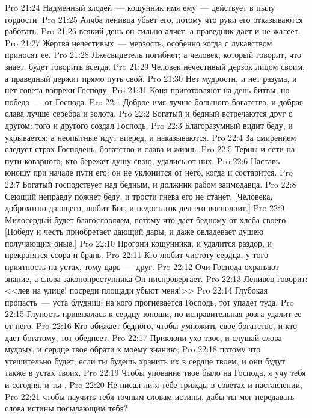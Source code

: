\vs Pro 21:24 Надменный злодей~--- кощунник имя ему~--- действует в пылу гордости.
\vs Pro 21:25 Алчба ленивца убьет его, потому что руки его отказываются работать;
\vs Pro 21:26 всякий день он сильно алчет, а праведник дает и не жалеет.
\vs Pro 21:27 Жертва нечестивых~--- мерзость, особенно когда с лукавством приносят ее.
\vs Pro 21:28 Лжесвидетель погибнет; а человек, который говорит, что знает, будет говорить всегда.
\vs Pro 21:29 Человек нечестивый дерзок лицом своим, а праведный держит прямо путь свой.
\vs Pro 21:30 Нет мудрости, и нет разума, и нет совета вопреки Господу.
\vs Pro 21:31 Коня приготовляют на день битвы, но победа~--- от Господа.
\vs Pro 22:1 Доброе имя лучше большого богатства, и добрая слава лучше серебра и золота.
\vs Pro 22:2 Богатый и бедный встречаются друг с другом: того и другого создал Господь.
\vs Pro 22:3 Благоразумный видит беду, и укрывается; а неопытные идут вперед, и наказываются.
\vs Pro 22:4 За смирением следует страх Господень, богатство и слава и жизнь.
\vs Pro 22:5 Терны и сети на пути коварного; кто бережет душу свою, удались от них.
\vs Pro 22:6 Наставь юношу при начале пути его: он не уклонится от него, когда и состарится.
\vs Pro 22:7 Богатый господствует над бедным, и должник  рабом заимодавца.
\vs Pro 22:8 Сеющий неправду пожнет беду, и трости гнева его не станет. [Человека, доброхотно дающего, любит Бог, и недостаток дел его восполнит.]
\vs Pro 22:9 Милосердый будет благословляем, потому что дает бедному от хлеба своего. [Победу и честь приобретает дающий дары, и даже овладевает душею получающих оные.]
\vs Pro 22:10 Прогони кощунника, и удалится раздор, и прекратятся ссора и брань.
\vs Pro 22:11 Кто любит чистоту сердца, у того приятность на устах, тому царь~--- друг.
\vs Pro 22:12 Очи Господа охраняют знание, а слова законопреступника Он ниспровергает.
\vs Pro 22:13 Ленивец говорит: <<лев на улице! посреди площади убьют меня!>>
\vs Pro 22:14 Глубокая пропасть~--- уста блудниц: на кого прогневается Господь, тот упадет туда.
\vs Pro 22:15 Глупость привязалась к сердцу юноши, но исправительная розга удалит ее от него.
\vs Pro 22:16 Кто обижает бедного, чтобы умножить свое богатство, и кто дает богатому, тот обеднеет.
\rsbpar\vs Pro 22:17 Приклони ухо твое, и слушай слова мудрых, и сердце твое обрати к моему знанию;
\vs Pro 22:18 потому что утешительно будет, если ты будешь хранить их в сердце твоем, и они будут также в устах твоих.
\vs Pro 22:19 Чтобы упование твое было на Господа, я учу тебя и сегодня, и ты .
\vs Pro 22:20 Не писал ли я тебе трижды в советах и наставлении,
\vs Pro 22:21 чтобы научить тебя точным словам истины, дабы ты мог передавать слова истины посылающим тебя?
